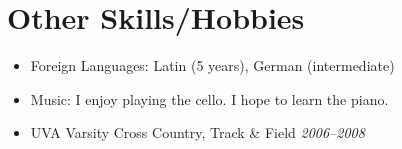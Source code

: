 \documentclass[a4paper,11pt]{article}
\begin{document}




\vskip 4pt
\section*{Other Skills/Hobbies}
\vskip 5pt

  \begin{itemize}
    \item Foreign Languages: Latin (5 years), German (intermediate)
    \item Music: I enjoy playing the cello. I hope to learn the piano.
    \item UVA Varsity Cross Country, Track \& Field \hfill \textit{2006--2008}
  \end{itemize}
\end{document}
